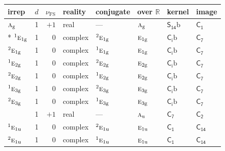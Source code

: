 \documentclass[10pt,a4paper]{article}
\numberwithin{equation}{section}
\newcommand{\grp}[1]{\mathsf{#1}}
\newcommand{\irr}[1]{\text{\normalfont\scshape #1}}
\newcommand{\conjpair}[1]{{}^{#1}}
\newcommand{\detbox}[1]{{\setlength{\fboxsep}{1pt}\fbox{#1}}}
\newcommand{\ptag}[1]{\mathrm{#1}}
\newcommand{\fsind}{\nu_{\mathrm{FS}}}
\newcommand{\secondclass}{\mathrm{b}}
\begin{document}
{\small\renewcommand{\arraystretch}{1.25}\setlength{\tabcolsep}{4pt}\begin{longtable}{@{}lrrlllll@{}}\toprule
irrep & $d$ & $\fsind$ & reality & conjugate & over $\mathbb{R}$ & kernel & image\\\midrule\endhead
\bottomrule\endfoot\endlastfoot
$\irr{a}_{\ptag{g}}$ & 1 & $+1$ & real & --- & $\irr{a}_{\ptag{g}}$ & \href{S14b.pdf}{$\grp{S_{14}}\secondclass$} & \href{../../../rotation/data/pdf/C1.pdf}{$\grp{C_{1}}$}\\*
$\conjpair{1}\irr{e}_{1\ptag{g}}$ & 1 & $0$ & complex & $\conjpair{2}\irr{e}_{1\ptag{g}}$ & $\irr{e}_{1\ptag{g}}$ & \href{S2b.pdf}{$\grp{C_{i}}\secondclass$} & \href{../../../rotation/data/pdf/C7.pdf}{$\grp{C_{7}}$}\\
$\conjpair{2}\irr{e}_{1\ptag{g}}$ & 1 & $0$ & complex & $\conjpair{1}\irr{e}_{1\ptag{g}}$ & $\irr{e}_{1\ptag{g}}$ & \href{S2b.pdf}{$\grp{C_{i}}\secondclass$} & \href{../../../rotation/data/pdf/C7.pdf}{$\grp{C_{7}}$}\\
$\conjpair{1}\irr{e}_{2\ptag{g}}$ & 1 & $0$ & complex & $\conjpair{2}\irr{e}_{2\ptag{g}}$ & $\irr{e}_{2\ptag{g}}$ & \href{S2b.pdf}{$\grp{C_{i}}\secondclass$} & \href{../../../rotation/data/pdf/C7.pdf}{$\grp{C_{7}}$}\\
$\conjpair{2}\irr{e}_{2\ptag{g}}$ & 1 & $0$ & complex & $\conjpair{1}\irr{e}_{2\ptag{g}}$ & $\irr{e}_{2\ptag{g}}$ & \href{S2b.pdf}{$\grp{C_{i}}\secondclass$} & \href{../../../rotation/data/pdf/C7.pdf}{$\grp{C_{7}}$}\\
$\conjpair{1}\irr{e}_{3\ptag{g}}$ & 1 & $0$ & complex & $\conjpair{2}\irr{e}_{3\ptag{g}}$ & $\irr{e}_{3\ptag{g}}$ & \href{S2b.pdf}{$\grp{C_{i}}\secondclass$} & \href{../../../rotation/data/pdf/C7.pdf}{$\grp{C_{7}}$}\\
$\conjpair{2}\irr{e}_{3\ptag{g}}$ & 1 & $0$ & complex & $\conjpair{1}\irr{e}_{3\ptag{g}}$ & $\irr{e}_{3\ptag{g}}$ & \href{S2b.pdf}{$\grp{C_{i}}\secondclass$} & \href{../../../rotation/data/pdf/C7.pdf}{$\grp{C_{7}}$}\\
\detbox{$\irr{a}_{\ptag{u}}$} & 1 & $+1$ & real & --- & $\irr{a}_{\ptag{u}}$ & \href{C7.pdf}{$\grp{C_{7}}$} & \href{../../../rotation/data/pdf/C2.pdf}{$\grp{C_{2}}$}\\
$\conjpair{1}\irr{e}_{1\ptag{u}}$ & 1 & $0$ & complex & $\conjpair{2}\irr{e}_{1\ptag{u}}$ & $\irr{e}_{1\ptag{u}}$ & \href{C1.pdf}{$\grp{C_{1}}$} & $\grp{C_{14}}$\\
$\conjpair{2}\irr{e}_{1\ptag{u}}$ & 1 & $0$ & complex & $\conjpair{1}\irr{e}_{1\ptag{u}}$ & $\irr{e}_{1\ptag{u}}$ & \href{C1.pdf}{$\grp{C_{1}}$} & $\grp{C_{14}}$\\

\end{longtable}}
\end{document}
